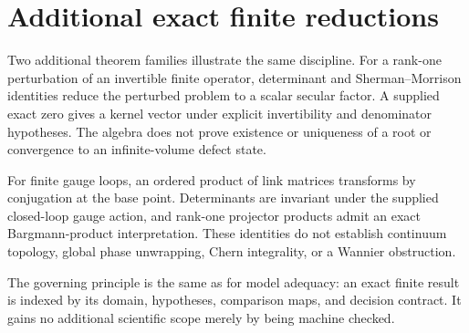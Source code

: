 \section{Additional exact finite reductions}

Two additional theorem families illustrate the same discipline.  For a rank-one
perturbation of an invertible finite operator, determinant and Sherman--Morrison
identities reduce the perturbed problem to a scalar secular factor.  A supplied exact
zero gives a kernel vector under explicit invertibility and denominator hypotheses.
The algebra does not prove existence or uniqueness of a root or convergence to an
infinite-volume defect state.

For finite gauge loops, an ordered product of link matrices transforms by conjugation at
the base point.  Determinants are invariant under the supplied closed-loop gauge action,
and rank-one projector products admit an exact Bargmann-product interpretation.  These
identities do not establish continuum topology, global phase unwrapping, Chern
integrality, or a Wannier obstruction.

The governing principle is the same as for model adequacy: an exact finite result is
indexed by its domain, hypotheses, comparison maps, and decision contract.  It gains no
additional scientific scope merely by being machine checked.
